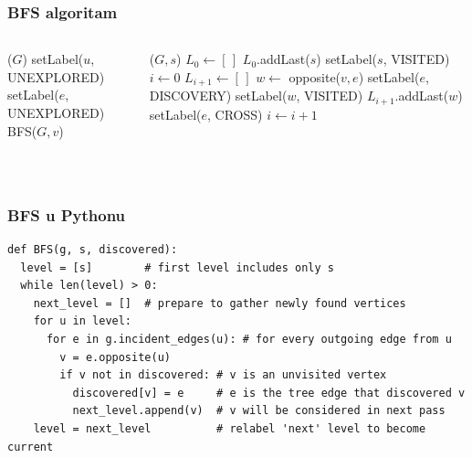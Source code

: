 \documentclass[compress,aspectratio=169]{beamer}
\begin{document}
\begin{frame}[fragile,shrink=2]
  \frametitle{BFS algoritam}
  {\footnotesize
  \begin{columns}
    \begin{column}[t]{5cm}
      \begin{algorithmic}
        \STATE {}($G$)
          \STATE setLabel($u$, {\scriptsize UNEXPLORED})
        \ENDFOR
          \STATE setLabel($e$, {\scriptsize UNEXPLORED})
        \ENDFOR
            \STATE BFS($G,v$)
          \ENDIF
        \ENDFOR
      \end{algorithmic}
    \end{column}
    \begin{column}[t]{7cm}
      \begin{algorithmic}
        \STATE {}($G,s$)
        \STATE $L_{0} \leftarrow [\,]$
        \STATE $L_{0}$.addLast($s$)
        \STATE setLabel($s$, {\scriptsize VISITED})
        \STATE $i \leftarrow 0$
          \STATE $L_{i+1} \leftarrow [\,]$
                \STATE $w \leftarrow$ opposite($v,e$)
                  \STATE setLabel($e$, {\scriptsize DISCOVERY})
                  \STATE setLabel($w$, {\scriptsize VISITED})
                  \STATE $L_{i+1}$.addLast($w$)
                \ELSE
                  \STATE setLabel($e$, {\scriptsize CROSS})
                \ENDIF
              \ENDIF
            \ENDFOR
          \ENDFOR
          $i \leftarrow i + 1$
        \ENDWHILE
      \end{algorithmic}
    \end{column}
  \end{columns}
  }

  \ %

\end{frame}

\begin{frame}[fragile,shrink=20]
  \frametitle{BFS u Pythonu}
\begin{verbatim}
def BFS(g, s, discovered):
  level = [s]        # first level includes only s
  while len(level) > 0:
    next_level = []  # prepare to gather newly found vertices
    for u in level:
      for e in g.incident_edges(u): # for every outgoing edge from u
        v = e.opposite(u)
        if v not in discovered: # v is an unvisited vertex
          discovered[v] = e     # e is the tree edge that discovered v
          next_level.append(v)  # v will be considered in next pass
    level = next_level          # relabel 'next' level to become current
\end{verbatim}
\end{frame}
\end{document}
